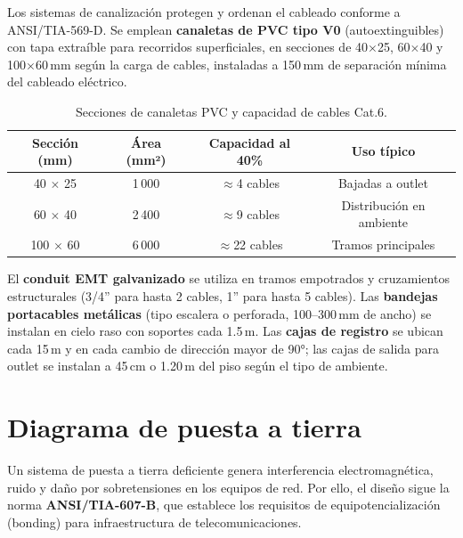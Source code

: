 Los sistemas de canalización protegen y ordenan el cableado conforme a
\mbox{ANSI/TIA-569-D}. Se emplean \textbf{canaletas de PVC tipo V0}
(autoextinguibles) con tapa extraíble para recorridos superficiales, en secciones
de 40$\times$25, 60$\times$40 y 100$\times$60\,mm según la carga de cables,
instaladas a 150\,mm de separación mínima del cableado eléctrico.

\begin{table}[H]
    \centering
    \caption{Secciones de canaletas PVC y capacidad de cables Cat.6.}
    \label{tab:canaletas}
    \begin{tabular}{|c|c|c|c|}
        \hline
        \textbf{Sección (mm)} & \textbf{Área (mm²)} &
        \textbf{Capacidad al 40\%} & \textbf{Uso típico} \\
        \hline
        40 $\times$ 25  & 1\,000 & $\approx$4 cables  & Bajadas a outlet \\
        60 $\times$ 40  & 2\,400 & $\approx$9 cables  & Distribución en ambiente \\
        100 $\times$ 60 & 6\,000 & $\approx$22 cables & Tramos principales \\
        \hline
    \end{tabular}
\end{table}

El \textbf{conduit EMT galvanizado} se utiliza en tramos empotrados y
cruzamientos estructurales (3/4'' para hasta 2 cables, 1'' para hasta 5 cables).
Las \textbf{bandejas portacables metálicas} (tipo escalera o perforada, 100--300\,mm
de ancho) se instalan en cielo raso con soportes cada 1.5\,m. Las \textbf{cajas de
registro} se ubican cada 15\,m y en cada cambio de dirección mayor de 90°; las cajas
de salida para outlet se instalan a 45\,cm o 1.20\,m del piso según el tipo de ambiente.

\section{Diagrama de puesta a tierra}
\label{sec:puesta_a_tierra}

Un sistema de puesta a tierra deficiente genera interferencia electromagnética,
ruido y daño por sobretensiones en los equipos de red. Por ello, el diseño sigue
la norma \textbf{\mbox{ANSI/TIA-607-B}}, que establece los requisitos de
equipotencialización (bonding) para infraestructura de telecomunicaciones.


